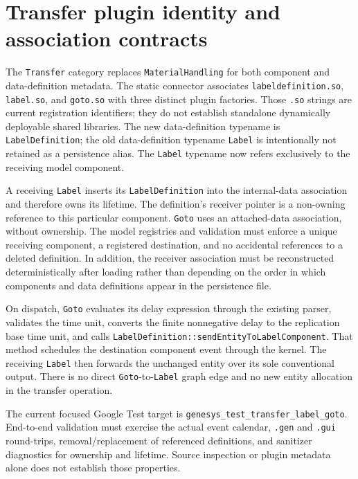 \section{Transfer plugin identity and association contracts}
\label{sec:plugin-transfer-label-goto}

The \texttt{Transfer} category replaces \texttt{MaterialHandling} for both
component and data-definition metadata. The static connector associates
\texttt{labeldefinition.so}, \texttt{label.so}, and \texttt{goto.so} with
three distinct plugin factories. Those \texttt{.so} strings are current
registration identifiers; they do not establish standalone dynamically
deployable shared libraries. The new data-definition typename is
\texttt{LabelDefinition}; the old data-definition typename \texttt{Label}
is intentionally not retained as a persistence alias. The \texttt{Label}
typename now refers exclusively to the receiving model component.

A receiving \texttt{Label} inserts its \texttt{LabelDefinition} into the
internal-data association and therefore owns its lifetime. The definition's
receiver pointer is a non-owning reference to this particular component.
\texttt{Goto} uses an attached-data association, without ownership. The
model registries and validation must enforce a unique receiving component,
a registered destination, and no accidental references to a deleted
definition. In addition, the receiver association must be reconstructed
deterministically after loading rather than depending on the order in which
components and data definitions appear in the persistence file.

On dispatch, \texttt{Goto} evaluates its delay expression through the
existing parser, validates the time unit, converts the finite nonnegative
delay to the replication base time unit, and calls
\texttt{LabelDefinition::sendEntity\allowbreak ToLabelComponent}. That method schedules
the destination component event through the kernel. The receiving
\texttt{Label} then forwards the unchanged entity over its sole conventional
output. There is no direct \texttt{Goto}-to-\texttt{Label} graph edge and no
new entity allocation in the transfer operation.

The current focused Google Test target is
\texttt{genesys\_test\_transfer\_label\_goto}. End-to-end validation must
exercise the actual event calendar, \texttt{.gen} and \texttt{.gui}
round-trips, removal/replacement of referenced definitions, and sanitizer
diagnostics for ownership and lifetime. Source inspection or plugin metadata
alone does not establish those properties.
